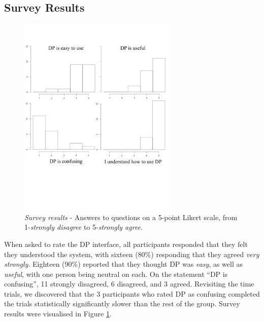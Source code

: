 \documentclass{sigchi}
\begin{document}

\subsection{Survey Results}

\begin{figure}[tbp]
\begin{center}
\includegraphics[width=7.5cm]{img/survey}
\caption{\emph{Survey results} - Answers to questions on a 5-point Likert scale, from 1-\emph{strongly disagree} to 5-\emph{strongly agree}.}
\label{fig:survey}
\end{center}
\end{figure}

When asked to rate the DP interface, all participants responded that they felt they understood the system, with sixteen (80\%) responding that they agreed \emph{very strongly}.  Eighteen (90\%) reported that they thought  DP was \emph{easy}, as well as \emph{useful}, with one person being neutral on each.  On the statement ``DP is confusing'',  11 strongly disagreed, 6 disagreed, and 3 agreed.  Revisiting the time trials, we discovered that the 3 participants who rated DP as confusing completed the trials statistically significantly slower than the rest of the group. Survey results were visualised in Figure \ref{fig:survey}.
\end{document}
